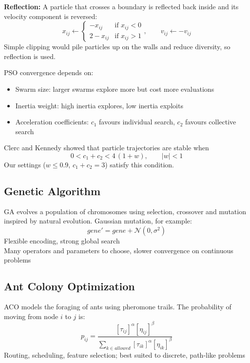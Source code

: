 \textbf{Reflection:} A particle that crosses a boundary is reflected back inside and its velocity component is reversed:
\begin{equation}
x_{ij} \gets \begin{cases} -x_{ij} & \text{if } x_{ij} < 0 \\ 2 - x_{ij} & \text{if } x_{ij} > 1 \end{cases}, \qquad v_{ij} \gets -v_{ij}
\end{equation}
Simple clipping would pile particles up on the walls and reduce diversity, so reflection is used.

PSO convergence depends on:
\begin{itemize}
\item Swarm size: larger swarms explore more but cost more evaluations
\item Inertia weight: high inertia explores, low inertia exploits
\item Acceleration coefficients: $c_1$ favours individual search, $c_2$ favours collective search
\end{itemize}
Clerc and Kennedy \cite{clerc2002} showed that particle trajectories are stable when
\begin{equation}
0 < c_1 + c_2 < 4\,(1 + w), \qquad |w| < 1
\end{equation}
Our settings ($w \le 0.9$, $c_1 + c_2 = 3$) satisfy this condition.

\subsection{Genetic Algorithm}
GA \cite{holland1975} evolves a population of chromosomes using selection, crossover and mutation inspired by natural evolution. Gaussian mutation, for example:
\begin{equation}
gene' = gene + \mathcal{N}(0, \sigma^2)
\end{equation}
 Flexible encoding, strong global search\\
 Many operators and parameters to choose, slower convergence on continuous problems

\subsection{Ant Colony Optimization}
ACO \cite{dorigo1996} models the foraging of ants using pheromone trails. The probability of moving from node $i$ to $j$ is:
\begin{equation}
p_{ij} = \frac{[\tau_{ij}]^{\alpha}[\eta_{ij}]^{\beta}}{\sum_{k \in allowed}[\tau_{ik}]^{\alpha}[\eta_{ik}]^{\beta}}
\end{equation}
 Routing, scheduling, feature selection; best suited to discrete, path-like problems

